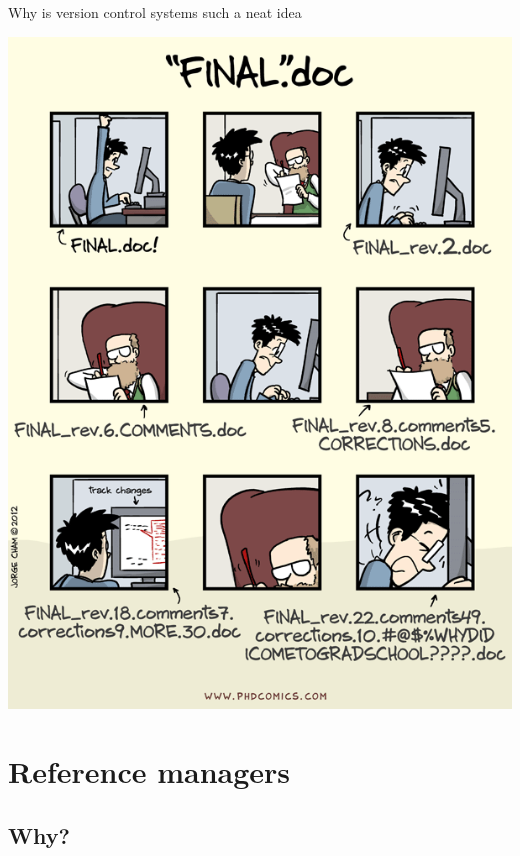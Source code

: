 \documentclass[ignorenonframetext,]{beamer}
\begin{document}
\begin{frame}{Why is version control systems such a neat idea}

\includegraphics{fig/phdcomic.png}

\end{frame}

\section{Reference managers}\label{reference-managers}

\subsection{Why?}\label{why-1}
\end{document}
